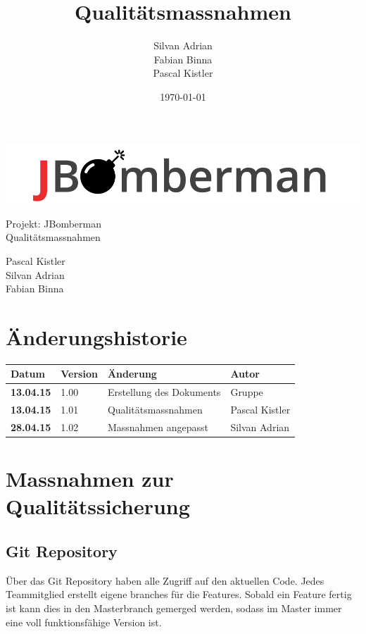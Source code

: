 \documentclass[11pt]{scrartcl}
\title{Qualitätsmassnahmen}
\author{Silvan Adrian \\ Fabian Binna \\ Pascal Kistler}
\date{\today{}}
\begin{document}
\def\arraystretch{1.5}
\begin{titlepage}
\begin{center}
\vspace{10em}
\includegraphics[scale=2]{jbomberman}
\vspace{10em}
\end{center}
\begin{center}
\huge {Projekt: JBomberman} \\
\huge {Qualitätsmassnahmen}
\end{center}
\begin{center}
\vspace{10em}
\LARGE {Pascal Kistler} \\
\LARGE {Silvan Adrian} \\
\LARGE {Fabian Binna}
\end{center}

\end{titlepage}

\newpage
\section{Änderungshistorie}
\label{sec:Änderungen}

\begin{tabularx}{\linewidth}{l l l l}
\textbf{Datum} & \textbf{Version} & \textbf{Änderung}  & \textbf{Autor} \\
\hline
\textbf{13.04.15} & 1.00 & Erstellung des Dokuments & Gruppe \\
\textbf{13.04.15} & 1.01 & Qualitätsmassnahmen & Pascal Kistler \\
\bf{28.04.15} & 1.02 & Massnahmen angepasst & Silvan Adrian
\end{tabularx}

\newpage
\tableofcontents
\newpage


\section{Massnahmen zur Qualitätssicherung}
\subsection{Git Repository}
Über das Git Repository haben alle Zugriff auf den aktuellen Code.
Jedes Teammitglied erstellt eigene branches für die Features.
Sobald ein Feature fertig ist kann dies in den Masterbranch gemerged werden, 
sodass im Master immer eine voll funktionsfähige Version  ist.
\end{document}
